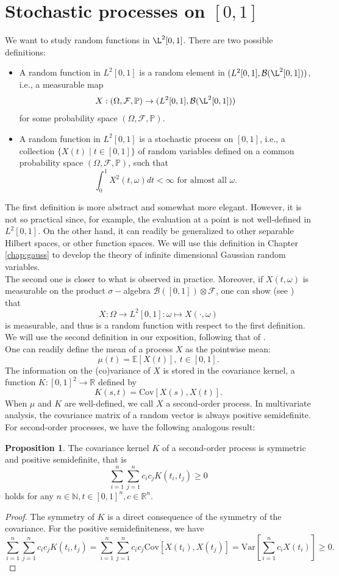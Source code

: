 \documentclass[10pt, a4paper]{report}
\newcommand{\E}[0]{\mathbb{E}}
\newcommand{\N}[0]{\mathbb{N}}
\newcommand{\R}[0]{\mathbb{R}}
\newcommand{\Pp}[0]{\mathbb{P}}
\newcommand{\F}[0]{\mathcal{F}}
\theoremstyle{definition}
\newtheorem{prop}{Proposition}
\theoremstyle{remark}
\begin{document}
\section{Stochastic processes on $[0,1]$}
We want to study random functions in $\L^2[0,1]$. There are two possible definitions:
\begin{itemize}
	\item A random function in $L^2[0,1]$ is a random element in $(L^2[0,1],\mathcal{B}(\L^2[0,1]))$, i.e., a measurable map $$X:(\Omega,\mathcal{F},\Pp) \to (L^2[0,1],\mathcal{B}(\L^2[0,1]))$$
	for some probability space $(\Omega,\mathcal{F},\Pp)$.
	\item A random function in $L^2[0,1]$ is a stochastic process on $[0,1]$, i.e., a collection $\{X(t) \mid t\in [0,1] \}$ of random variables defined on a common probability space $(\Omega,\mathcal{F},\Pp)$, such that 
	$$\int_{0}^{1} X^2(t,\omega) dt < \infty \text{ for almost all } \omega.$$ 
\end{itemize}
The first definition is more abstract and somewhat more elegant. However, it is not so practical since, for example, the evaluation at a point is not well-defined in $L^2[0,1]$. On the other hand, it can readily be generalized to other separable Hilbert spaces, or other function spaces. We will use this definition in Chapter \ref{chap:gauss} to develop the theory of infinite dimensional Gaussian random variables.\\
The second one is closer to what is observed in practice. Moreover, if $X(t,\omega)$ is measurable on the product $\sigma-$algebra $\mathcal{B}([0,1]) \otimes \F$, one can show (see \cite[Theorem 7.4.1]{found}) that 
$$X: \Omega \to L^2[0,1]: \omega \mapsto X(\cdot,\omega)$$
is measurable, and thus is a random function with respect to the first definition.\\
We will use the second definition in our exposition, following that of \cite{found}.\\
One can readily define the mean of a process $X$ as the pointwise mean:
$$\mu(t) = \E[X(t)], \ t \in [0,1].$$
The information on the (co)variance of $X$ is stored in the covariance kernel, a function $K:[0,1]^2 \to \R$ defined by 
$$K(s,t) = \mathrm{Cov}[X(s),X(t)].$$
When $\mu$ and $K$ are well-defined, we call $X$ a second-order process. In multivariate analysis, the covariance matrix of a random vector is always positive semidefinite. For second-order processes, we have the following analogous result:
\begin{prop}
	The covariance kernel $K$ of a second-order process is symmetric and positive semidefinite, that is 
	$$\sum_{i=1}^{n}\sum_{j=1}^{n}c_i c_j K(t_i,t_j) \geq 0$$
	holds for any $n\in \N,t \in [0,1]^n, c\in \R^n$.
	\begin{proof}
		The symmetry of $K$ is a direct consequence of the symmetry of the covariance. For the positive semidefiniteness, we have
		$$\sum_{i=1}^{n}\sum_{j=1}^{n}c_i c_j K(t_i,t_j) = \sum_{i=1}^{n}\sum_{j=1}^{n}c_i c_j \mathrm{Cov}[X(t_i),X(t_j)] = \mathrm{Var}\left[\sum_{i=1}^{n}c_iX(t_i)\right]\geq  0.$$
	\end{proof}
\end{prop} 
\end{document}
